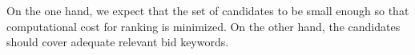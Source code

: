 On the one hand, we expect that the set of candidates to be small enough so
that computational cost for ranking is minimized.  On the other hand,
the candidates should cover adequate relevant bid keywords.


